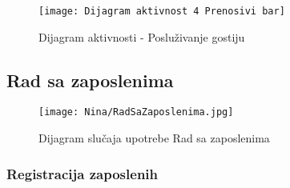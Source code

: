 \documentclass[a4paper]{article}
\begin{document}
\begin{figure}[H]
    \centering
    \texttt{[image: Dijagram aktivnost 4 Prenosivi bar]}
    \caption{Dijagram aktivnosti - Posluživanje gostiju}
    \label{fig:PrenosiviBar}
\end{figure}

\subsection{Rad sa zaposlenima}

\begin{figure}[H]
    \centering
    \texttt{[image: Nina/RadSaZaposlenima.jpg]}
    \caption{Dijagram slučaja upotrebe Rad sa zaposlenima}
    \label{fig:RegistracijaZ}
\end{figure}

\subsubsection{Registracija zaposlenih}
\end{document}
